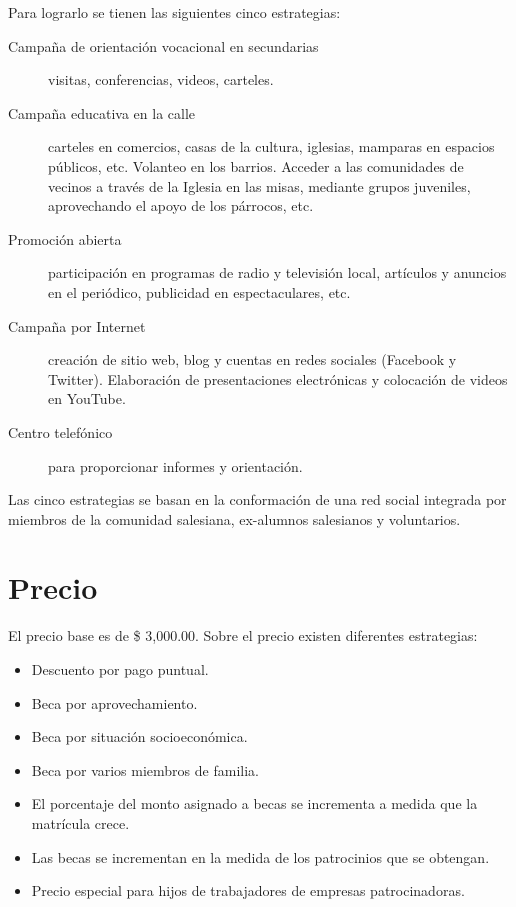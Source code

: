 Para lograrlo se tienen las siguientes cinco estrategias:

\begin{description}
	\item[Campaña de orientación vocacional en secundarias] visitas, conferencias, videos, carteles.
	\item[Campaña educativa en la calle] carteles en comercios, casas de la cultura, iglesias, mamparas en espacios públicos, etc. Volanteo en los barrios. Acceder a las comunidades de vecinos a través de la Iglesia en las misas, mediante grupos juveniles, aprovechando el apoyo de los párrocos, etc.
	\item[Promoción abierta] participación en programas de radio y televisión local, artículos y anuncios en el periódico, publicidad en espectaculares, etc.
	\item[Campaña por Internet] creación de sitio web, blog y cuentas en redes sociales (Facebook y Twitter). Elaboración de presentaciones electrónicas y colocación de videos en YouTube.
	\item[Centro telefónico] para proporcionar informes y orientación.
\end{description}

Las cinco estrategias se basan en la conformación de una red social integrada por miembros de la comunidad salesiana, ex-alumnos salesianos y voluntarios.

\section{Precio}

El precio base es de \$ 3,000.00. Sobre el precio existen diferentes estrategias:

\begin{itemize}
	\item Descuento por pago puntual.
	\item Beca por aprovechamiento.
	\item Beca por situación socioeconómica.
	\item Beca por varios miembros de familia.
	\item El porcentaje del monto asignado a becas se incrementa a medida que la matrícula crece.
	\item Las becas se incrementan en la medida de los patrocinios que se obtengan.
	\item Precio especial para hijos de trabajadores de empresas patrocinadoras.
\end{itemize}
